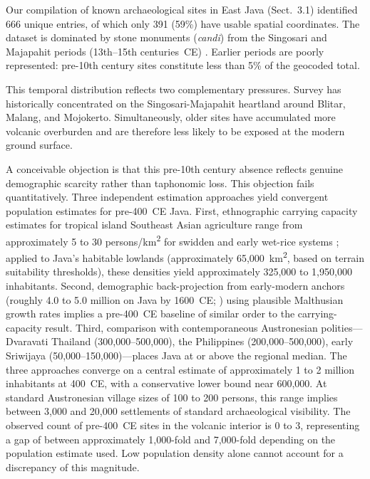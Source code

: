 \documentclass[12pt,a4paper]{article}
\begin{document}
Our compilation of known archaeological sites in East Java (Sect.~3.1) identified 666 unique entries, of which only 391 (59\%) have usable spatial coordinates. The dataset is dominated by stone monuments (\textit{candi}) from the Singosari and Majapahit periods (13th--15th centuries~CE) \citep{kinney2003}. Earlier periods are poorly represented: pre-10th century sites constitute less than 5\% of the geocoded total.

This temporal distribution reflects two complementary pressures. Survey has historically concentrated on the Singosari-Majapahit heartland around Blitar, Malang, and Mojokerto. Simultaneously, older sites have accumulated more volcanic overburden and are therefore less likely to be exposed at the modern ground surface.

A conceivable objection is that this pre-10th century absence reflects genuine demographic scarcity rather than taphonomic loss. This objection fails quantitatively. Three independent estimation approaches yield convergent population estimates for pre-400~CE Java. First, ethnographic carrying capacity estimates for tropical island Southeast Asian agriculture range from approximately 5 to 30 persons/km\textsuperscript{2} for swidden and early wet-rice systems \citep{bellwood2017,kirch2000,baylisssmith1980}; applied to Java's habitable lowlands (approximately 65,000~km\textsuperscript{2}, based on terrain suitability thresholds), these densities yield approximately 325,000 to 1,950,000 inhabitants. Second, demographic back-projection from early-modern anchors (roughly 4.0 to 5.0 million on Java by 1600~CE; \citealp{reid1988}) using plausible Malthusian growth rates implies a pre-400~CE baseline of similar order to the carrying-capacity result. Third, comparison with contemporaneous Austronesian polities---Dvaravati Thailand (300,000--500,000), the Philippines (200,000--500,000), early Sriwijaya (50,000--150,000)---places Java at or above the regional median. The three approaches converge on a central estimate of approximately 1 to 2 million inhabitants at 400~CE, with a conservative lower bound near 600,000. At standard Austronesian village sizes of 100 to 200 persons, this range implies between 3,000 and 20,000 settlements of standard archaeological visibility. The observed count of pre-400~CE sites in the volcanic interior is 0 to 3, representing a gap of between approximately 1,000-fold and 7,000-fold depending on the population estimate used. Low population density alone cannot account for a discrepancy of this magnitude.
\end{document}
